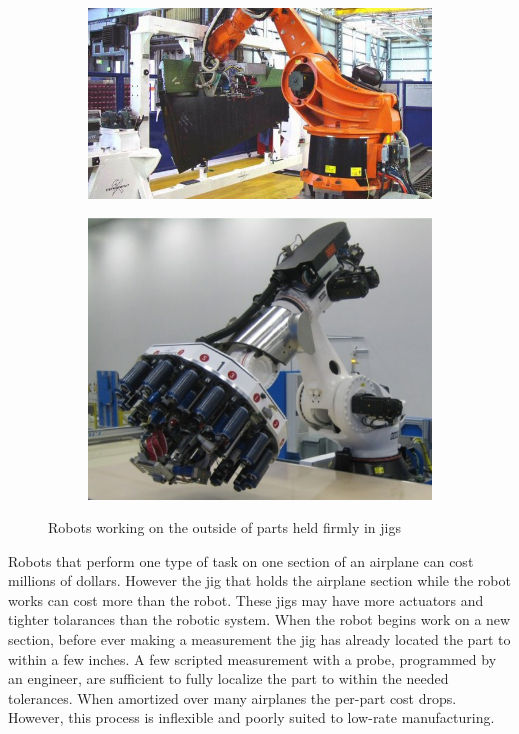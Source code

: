 \documentclass[../thesis.tex]{subfiles}
\begin{document}
\begin{figure}
  \centering
  \begin{subfigure}[b]{0.586\linewidth}
    \includegraphics[width=\linewidth]{./Introduction/Robot1Outside.jpg}    
  \end{subfigure}
  \hfill
  \begin{subfigure}[b]{0.4\linewidth}
    \includegraphics[width=\linewidth]{./Introduction/Robot2Outside.jpg}    
  \end{subfigure}
  \label{fig:KukaRobots}
  \caption{Robots working on the outside of parts held firmly in jigs}
\end{figure}

Robots that perform one type of task on one section of an airplane can cost millions of dollars.
However the jig that holds the airplane section while the robot works can cost more than the robot.
These jigs may have more actuators and tighter tolarances than the robotic system.
When the robot begins work on a new section, before ever making a measurement the jig has already located the part to within a few inches.
A few scripted measurement with a probe, programmed by an engineer, are sufficient to fully localize the part to within the needed tolerances.
When amortized over many airplanes the per-part cost drops.
However, this process is inflexible and poorly suited to low-rate manufacturing.
\end{document}
